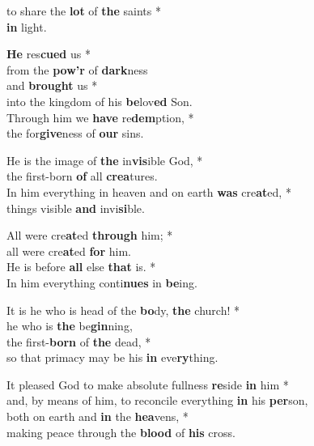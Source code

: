 
to share the \textbf{lot} of \textbf{the} saints *\\
\textbf{in} light.

\textbf{He} res\textbf{cued} us *\\
from the \textbf{pow'r} of \textbf{dark}ness\\
and \textbf{brought} us *\\
into the kingdom of his \textbf{be}lov\textbf{ed} Son.\\
Through him we \textbf{have} re\textbf{dem}ption, *\\
the for\textbf{give}ness of \textbf{our} sins.

He is the image of \textbf{the} in\textbf{vis}ible God, *\\
the first-born \textbf{of} all \textbf{crea}tures.\\
In him everything in heaven and on earth \textbf{was} cre\textbf{at}ed, *\\
things visible \textbf{and} invi\textbf{si}ble.

All were cre\textbf{at}ed \textbf{through} him; *\\
all were cre\textbf{at}ed \textbf{for} him.\\
He is before \textbf{all} else \textbf{that} is. *\\
In him everything conti\textbf{nues} in \textbf{be}ing.

It is he who is head of the \textbf{bo}dy, \textbf{the} church! *\\
he who is \textbf{the} be\textbf{gin}ning,\\
the first-\textbf{born} of \textbf{the} dead, *\\
so that primacy may be his \textbf{in} eve\textbf{ry}thing.

It pleased God to make absolute fullness \textbf{re}side \textbf{in} him *\\
and, by means of him, to reconcile everything \textbf{in} his \textbf{per}son,\\
both on earth and \textbf{in} the \textbf{hea}vens, *\\
making peace through the \textbf{blood} of \textbf{his} cross.